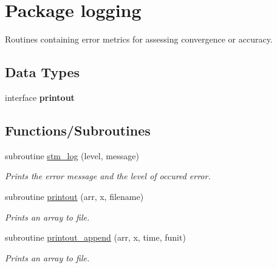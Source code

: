 \hypertarget{a00065}{
\section{Package logging}
\label{a00065}
}
Routines containing error metrics for assessing convergence or accuracy.  


\subsection*{Data Types}
\begin{CompactItemize}
\item 
interface \textbf{printout}
\end{CompactItemize}
\subsection*{Functions/Subroutines}
\begin{CompactItemize}
\item 
subroutine \hyperlink{a00065_b4fd0509a85809a15a217efeacc0b345}{stm\_\-log} (level, message)
\begin{CompactList}\small\item\em Prints the error message and the level of occured error. \item\end{CompactList}\item 
subroutine \hyperlink{a00065_edbe5e4dde2de733c331141c3d226c59}{printout} (arr, x, filename)
\begin{CompactList}\small\item\em Prints an array to file. \item\end{CompactList}\item 
subroutine \hyperlink{a00065_6966605901ff13e951cea8f6853cf41b}{printout\_\-append} (arr, x, time, funit)
\begin{CompactList}\small\item\em Prints an array to file. \item\end{CompactList}\end{CompactItemize}
